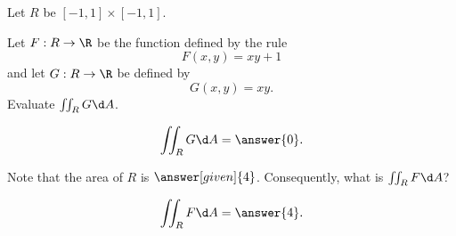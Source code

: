 \documentclass{ximera}
\author{Jim Fowler}
\begin{document}
\begin{exercise}
  Let $R$ be $[-1,1] \times [-1,1]$.
  
  Let $F : R \to \R$ be the function defined by the rule
  \[
    F(x,y) = xy + 1
  \] and let $G : R \to \R$ be defined by
  \[
    G(x,y) = xy.
  \]
  Evaluate $\iint_R G \d A$.
  \begin{prompt}
    \[
      \iint_R G \d A = \answer{0}.
    \]
  \end{prompt}

  Note that the area of $R$ is $\answer[given]{4}$.  Consequently, what is $\iint_R F \d A$?
  \begin{prompt}
    \[
      \iint_R F \d A = \answer{4}.
    \]
  \end{prompt}  

\end{exercise}
\end{document}
